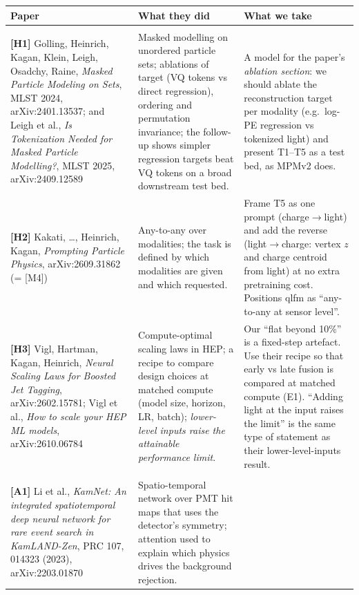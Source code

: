 \documentclass[11pt,a4paper]{article}
\begin{document}
\begin{table}[H]\centering\footnotesize
\begin{tabularx}{\textwidth}{>{\raggedright\arraybackslash}p{4.3cm}LL}\toprule
Paper & What they did & What we take\\\midrule
{}\\\midrule
\textbf{[H1]} Golling, Heinrich, Kagan, Klein, Leigh, Osadchy, Raine, \emph{Masked Particle Modeling on Sets}, MLST 2024, arXiv:2401.13537; and Leigh et al., \emph{Is Tokenization Needed for Masked Particle Modelling?}, MLST 2025, arXiv:2409.12589 &
Masked modelling on unordered particle sets; ablations of target (VQ tokens vs direct regression), ordering and permutation invariance; the follow-up shows simpler regression targets beat VQ tokens on a broad downstream test bed. &
A model for the paper's \emph{ablation section}: we should ablate the reconstruction target per modality (e.g.\ log-PE regression vs tokenized light) and present T1--T5 as a test bed, as MPMv2 does.\\\midrule
\textbf{[H2]} Kakati, \dots, Heinrich, Kagan, \emph{Prompting Particle Physics}, arXiv:2609.31862 (= [M4]) &
Any-to-any over modalities; the task is defined by which modalities are given and which requested. &
Frame T5 as one prompt (charge$\to$light) and add the reverse (light$\to$charge: vertex $z$ and charge centroid from light) at no extra pretraining cost. Positions qlfm as ``any-to-any at sensor level''.\\\midrule
\textbf{[H3]} Vigl, Hartman, Kagan, Heinrich, \emph{Neural Scaling Laws for Boosted Jet Tagging}, arXiv:2602.15781; Vigl et al., \emph{How to scale your HEP ML models}, arXiv:2610.06784 &
Compute-optimal scaling laws in HEP; a recipe to compare design choices at matched compute (model size, horizon, LR, batch); \emph{lower-level inputs raise the attainable performance limit}. &
Our ``flat beyond 10\%'' is a fixed-step artefact. Use their recipe so that early vs late fusion is compared at matched compute (E1). ``Adding light at the input raises the limit'' is the same type of statement as their lower-level-inputs result.\\\midrule
{}\\\midrule
\textbf{[A1]} Li et al., \emph{KamNet: An integrated spatiotemporal deep neural network for rare event search in KamLAND-Zen}, PRC 107, 014323 (2023), arXiv:2203.01870 &
Spatio-temporal network over PMT hit maps that uses the detector's symmetry; attention used to explain which physics drives the background rejection. &

\end{tabularx}
\end{table}
\end{document}
